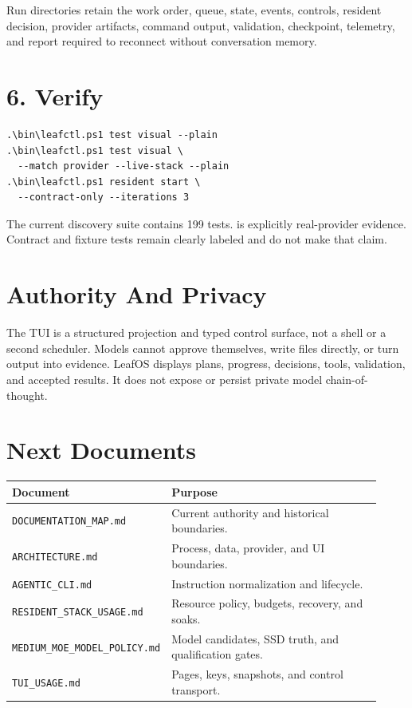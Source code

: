 \documentclass[11pt,a4paper]{article}
\begin{document}
Run directories retain the work order, queue, state, events, controls,
resident decision, provider artifacts, command output, validation, checkpoint,
telemetry, and report required to reconnect without conversation memory.

\section*{6. Verify}

\begin{lstlisting}
.\bin\leafctl.ps1 test visual --plain
.\bin\leafctl.ps1 test visual \
  --match provider --live-stack --plain
.\bin\leafctl.ps1 resident start \
  --contract-only --iterations 3
\end{lstlisting}

The current discovery suite contains 199 tests.
is explicitly real-provider evidence. Contract and fixture tests remain
clearly labeled and do not make that claim.

\section*{Authority And Privacy}

The TUI is a structured projection and typed control surface, not a shell or a
second scheduler. Models cannot approve themselves, write files directly, or
turn output into evidence. LeafOS displays plans, progress, decisions, tools,
validation, and accepted results. It does not expose or persist private model
chain-of-thought.

\section*{Next Documents}

\begin{tabular}{@{}p{0.31\linewidth}p{0.61\linewidth}@{}}
\toprule
Document & Purpose \\
\midrule
\texttt{DOCUMENTATION\_MAP.md} & Current authority and historical boundaries. \\
\texttt{ARCHITECTURE.md} & Process, data, provider, and UI boundaries. \\
\texttt{AGENTIC\_CLI.md} & Instruction normalization and lifecycle. \\
\texttt{RESIDENT\_STACK\_USAGE.md} & Resource policy, budgets, recovery, and soaks. \\
\texttt{MEDIUM\_MOE\_MODEL\_POLICY.md} & Model candidates, SSD truth, and qualification gates. \\
\texttt{TUI\_USAGE.md} & Pages, keys, snapshots, and control transport. \\
\bottomrule
\end{tabular}
\end{document}
